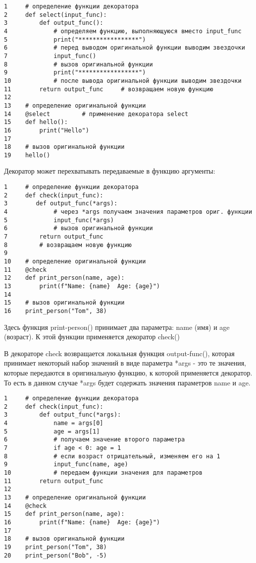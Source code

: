 \documentclass[12pt, a4paper]{article}
\begin{document}
\begin{verbatim}
1     # определение функции декоратора
2     def select(input_func):    
3         def output_func():      
4             # определяем функцию, выполняющуюся вместо input_func
5             print("*****************")  
6             # перед выводом оригинальной функции выводим звездочки
7             input_func()                
8             # вызов оригинальной функции
9             print("*****************")  
10            # после вывода оригинальной функции выводим звездочки
11        return output_func     # возвращаем новую функцию
12 
13    # определение оригинальной функции
14    @select         # применение декоратора select
15    def hello():
16        print("Hello")
17 
18    # вызов оригинальной функции
19    hello()
\end{verbatim}

Декоратор может перехватывать передаваемые в функцию аргументы:

\begin{verbatim}
1     # определение функции декоратора
2     def check(input_func):    
3        def output_func(*args):      
4             # через *args получаем значения параметров ориг. функции
5             input_func(*args)                
6             # вызов оригинальной функции
7         return output_func     
8         # возвращаем новую функцию
9  
10    # определение оригинальной функции
11    @check
12    def print_person(name, age):
13        print(f"Name: {name}  Age: {age}")
14 
15    # вызов оригинальной функции
16    print_person("Tom", 38)
\end{verbatim}

Здесь функция print-person() принимает два параметра: name (имя) и age (возраст). К этой функции применяется декоратор check()

\vspace{1em}

В декораторе check возвращается локальная функция output-func(), которая принимает некоторый набор значений в виде параметра *args - это те значения, которые передаются в оригинальную функцию, к которой применяется декоратор. То есть в данном случае *args будет содержать значения параметров name и age.

\begin{verbatim}
1     # определение функции декоратора
2     def check(input_func):    
3         def output_func(*args):
4             name = args[0]
5             age = args[1]           
6             # получаем значение второго параметра
7             if age < 0: age = 1     
8             # если возраст отрицательный, изменяем его на 1
9             input_func(name, age)   
10            # передаем функции значения для параметров
11        return output_func
12 
13    # определение оригинальной функции
14    @check
15    def print_person(name, age):
16        print(f"Name: {name}  Age: {age}")
17 
18    # вызов оригинальной функции
19    print_person("Tom", 38)
20    print_person("Bob", -5)
\end{verbatim}
\end{document}
